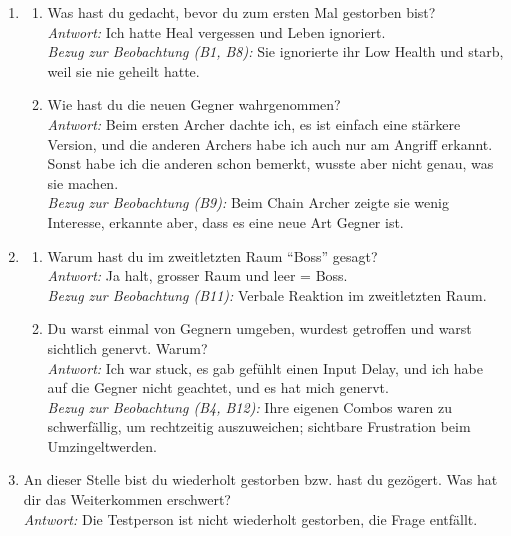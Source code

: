\documentclass[../Main.tex]{subfiles}
\begin{document}
\begin{enumerate}[label=\textbf{I\arabic*}, leftmargin=1.5cm, itemsep=1em]
\item
\begin{enumerate}[label=\alph*), itemsep=0.6em]
    \item Was hast du gedacht, bevor du zum ersten Mal gestorben bist? \\
        \textit{Antwort:} Ich hatte Heal vergessen und Leben ignoriert. \\
        \textit{Bezug zur Beobachtung (B1, B8):} Sie ignorierte ihr Low Health und starb, weil sie nie geheilt hatte.
    \item Wie hast du die neuen Gegner wahrgenommen? \\
        \textit{Antwort:} Beim ersten Archer dachte ich, es ist einfach eine stärkere Version, und die anderen Archers habe ich auch nur am Angriff erkannt. Sonst habe ich die anderen schon bemerkt, wusste aber nicht genau, was sie machen. \\
        \textit{Bezug zur Beobachtung (B9):} Beim Chain Archer zeigte sie wenig Interesse, erkannte aber, dass es eine neue Art Gegner ist.
\end{enumerate}

\item
\begin{enumerate}[label=\alph*), itemsep=0.6em]
\item Warum hast du im zweitletzten Raum \enquote{Boss} gesagt? \\
    \textit{Antwort:} Ja halt, grosser Raum und leer = Boss. \\
    \textit{Bezug zur Beobachtung (B11):} Verbale Reaktion im zweitletzten Raum.
\item Du warst einmal von Gegnern umgeben, wurdest getroffen und warst sichtlich genervt. Warum? \\
    \textit{Antwort:} Ich war stuck, es gab gefühlt einen Input Delay, und ich habe auf die Gegner nicht geachtet, und es hat mich genervt. \\
    \textit{Bezug zur Beobachtung (B4, B12):} Ihre eigenen Combos waren zu schwerfällig, um rechtzeitig auszuweichen; sichtbare Frustration beim Umzingeltwerden.
\end{enumerate}

\item An dieser Stelle bist du wiederholt gestorben bzw. hast du gezögert. Was hat dir das Weiterkommen erschwert? \\
\textit{Antwort:} Die Testperson ist nicht wiederholt gestorben, die Frage entfällt.


\end{enumerate}
\end{document}

